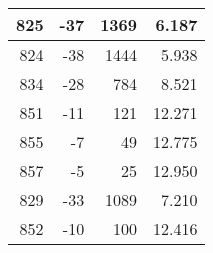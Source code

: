 \begin{longtable}{|r|r|r|r|}
	825                                                                                             & -37                                               & 1369                                                 & 6.187                                                                                          \\ \hline
	824                                                                                             & -38                                               & 1444                                                 & 5.938                                                                                          \\ \hline
	834                                                                                             & -28                                               & 784                                                  & 8.521                                                                                          \\ \hline
	851                                                                                             & -11                                               & 121                                                  & 12.271                                                                                         \\ \hline
	855                                                                                             & -7                                                & 49                                                   & 12.775                                                                                         \\ \hline
	857                                                                                             & -5                                                & 25                                                   & 12.950                                                                                         \\ \hline
	829                                                                                             & -33                                               & 1089                                                 & 7.210                                                                                          \\ \hline
	852                                                                                             & -10                                               & 100                                                  & 12.416                                                                                         \\ \hline

\end{longtable}
